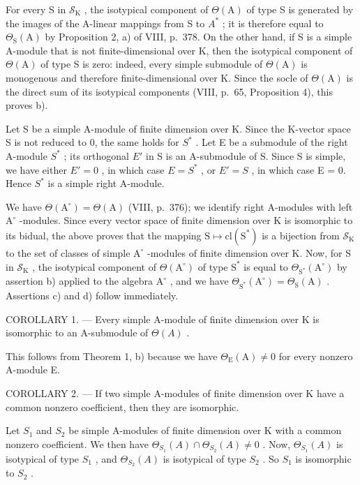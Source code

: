 For every S in \(\mathcal{S}_{\mathrm{K}}\) , the isotypical component of \(\Theta(\mathrm{A})\) of type S is generated by the images of the A-linear mappings from S to \(A^{*}\) ; it is therefore equal to \(\Theta_{\mathrm{S}}(\mathrm{A})\) by Proposition 2, a) of VIII, p.~378. On the other hand, if S is a simple A-module that is not finite-dimensional over K, then the isotypical component of \(\Theta(\mathrm{A})\) of type S is zero: indeed, every simple submodule of \(\Theta(\mathrm{A})\) is monogenous and therefore finite-dimensional over K. Since the socle of \(\Theta(\mathrm{A})\) is the direct sum of its isotypical components (VIII, p.~65, Proposition 4), this proves b).

Let S be a simple A-module of finite dimension over K. Since the K-vector space S is not reduced to 0, the same holds for \(S^{*}\) . Let E be a submodule of the right A-module \(S^{*}\) ; its orthogonal \(E'\) in S is an A-submodule of S. Since S is simple, we have either \(E' = 0\) , in which case \(E = S^{*}\) , or \(E' = S\) , in which case E = 0. Hence \(S^{*}\) is a simple right A-module.

We have \(\Theta (\mathrm{A}^{\circ}) = \Theta (\mathrm{A})\) (VIII, p.~376); we identify right A-modules with left \(\mathrm{A}^{\circ}\) -modules. Since every vector space of finite dimension over K is isomorphic to its bidual, the above proves that the mapping \(\mathrm{S}\mapsto \mathrm{cl}(\mathrm{S}^{*})\) is a bijection from \(\mathcal{S}_{\mathrm{K}}\) to the set of classes of simple \(\mathrm{A}^{\circ}\) -modules of finite dimension over K. Now, for S in \(\mathcal{S}_{\mathrm{K}}\) , the isotypical component of \(\Theta (\mathrm{A}^{\circ})\) of type \(\mathrm{S}^*\) is equal to \(\Theta_{\mathrm{S}^*}(\mathrm{A}^{\circ})\) by assertion b) applied to the algebra \(\mathrm{A}^{\circ}\) , and we have \(\Theta_{\mathrm{S}^*}(\mathrm{A}^{\circ}) = \Theta_{\mathrm{S}}(\mathrm{A})\) . Assertions c) and d) follow immediately.

COROLLARY 1. --- Every simple A-module of finite dimension over K is isomorphic to an A-submodule of \(\Theta(A)\) .

This follows from Theorem 1, b) because we have \(\Theta_{\mathrm{E}}(\mathrm{A}) \neq 0\) for every nonzero A-module E.

COROLLARY 2. --- If two simple A-modules of finite dimension over K have a common nonzero coefficient, then they are isomorphic.

Let \(S_{1}\) and \(S_{2}\) be simple A-modules of finite dimension over K with a common nonzero coefficient. We then have \(\Theta_{S_{1}}(A) \cap \Theta_{S_{2}}(A) \neq 0\) . Now, \(\Theta_{S_{1}}(A)\) is isotypical of type \(S_{1}\) , and \(\Theta_{S_{2}}(A)\) is isotypical of type \(S_{2}\) . So \(S_{1}\) is isomorphic to \(S_{2}\) .

